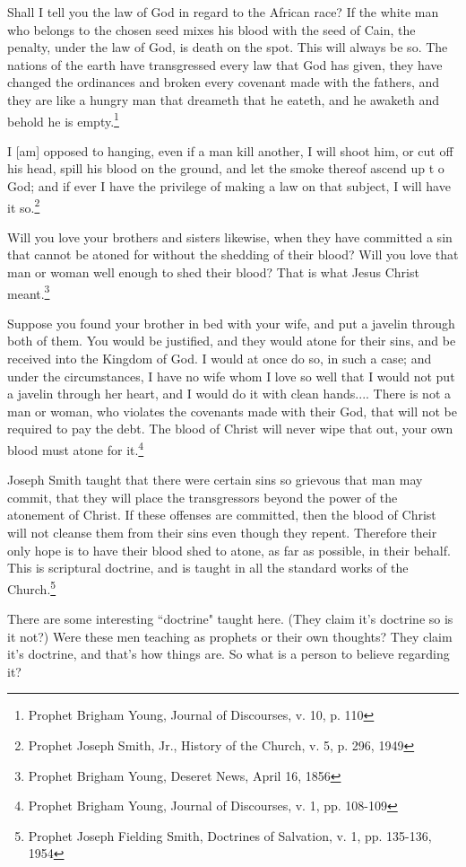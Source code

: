 \begin{displayquote}
Shall I tell you the law of God in regard to the African race? If the white man 
who belongs to the chosen seed mixes his blood with the seed of Cain, the penalty, 
under the law of God, is death on the spot. This will always be so. The nations of 
the earth have transgressed every law that God has given, they have changed the 
ordinances and broken every covenant made with the fathers, and they are like a 
hungry man that dreameth that he eateth, and he awaketh and behold he is
empty.\footnote{Prophet Brigham Young, Journal of Discourses, v. 10, p. 110}
\end{displayquote}

\begin{displayquote}
I [am] opposed to hanging, even if a man kill another, I will shoot him, or cut 
off his head, spill his blood on the ground, and let the smoke thereof ascend up t
o God; and if ever I have the privilege of making a law on that subject, 
I will have it so.\footnote{Prophet Joseph Smith, Jr., History of the Church, v. 
5, p. 296, 1949}
\end{displayquote}

\begin{displayquote}
Will you love your brothers and sisters likewise, when they have committed a sin 
that cannot be atoned for without the shedding of their blood? Will you love that 
man or woman well enough to shed their blood? That is what Jesus Christ
meant.\footnote{Prophet Brigham Young, Deseret News, April 16, 1856}
\end{displayquote}

\begin{displayquote}
Suppose you found your brother in bed with your wife, and put a javelin through 
both of them. You would be justified, and they would atone for their sins, and be 
received into the Kingdom of God. I would at once do so, in such a case; and under 
the circumstances, I have no wife whom I love so well that I would not put a 
javelin through her heart, and I would do it with clean hands.... There is not a 
man or woman, who violates the covenants made with their God, that will not be 
required to pay the debt. The blood of Christ will never wipe that out, your own 
blood must atone for it.\footnote{Prophet Brigham Young, Journal of Discourses, v. 
1, pp. 108-109}
\end{displayquote}

\begin{displayquote}
Joseph Smith taught that there were certain sins so grievous that man may commit, 
that they will place the transgressors beyond the power of the atonement of Christ. 
If these offenses are committed, then the blood of Christ will not cleanse them 
from their sins even though they repent. Therefore their only hope is to have 
their blood shed to atone, as far as possible, in their behalf. This is scriptural 
doctrine, and is taught in all the standard works of the Church.\footnote{
Prophet Joseph Fielding Smith, Doctrines of Salvation, v. 1, pp. 135-136, 1954
}
\end{displayquote}

There are some interesting ``doctrine" taught here. (They claim it's doctrine so
is it not?) Were these men teaching as prophets or their own thoughts? They claim
it's doctrine, and that's how things are. So what is a person to believe regarding
it?